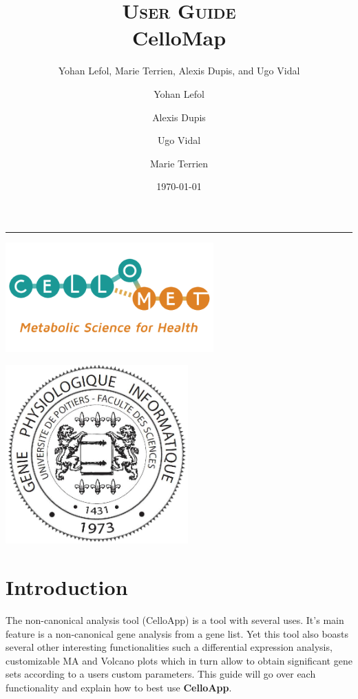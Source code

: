 \documentclass[11pt]{article}
\author{Yohan Lefol, Marie Terrien, Alexis Dupis, and Ugo Vidal}
\title{
\textsc{User Guide}\\[2.6cm]
{\LARGE \bfseries CelloMap}
}
\author{
Yohan Lefol
\and 
Alexis Dupis
\and
Ugo Vidal
\and
Marie Terrien
}
\date{
\today
}
\begin{document}
\maketitle
\hrule
\begin{center}
\includegraphics[width = 8cm]{logo-CELLOMET-a.png}
\end{center}

\begin{center}
\includegraphics[width = 7cm]{Logo-Master-GPhy.png}
\end{center}
\newpage
\section{Introduction \label{intro}}
The non-canonical analysis tool (CelloApp) is a tool with several uses. It's main feature is a non-canonical gene analysis from a gene list. Yet this tool also boasts several other interesting functionalities such a differential expression analysis, customizable MA and Volcano plots which in turn allow to obtain significant gene sets according to a users custom parameters.
This guide will go over each functionality and explain how to best use \textbf{CelloApp}.
\end{document}
